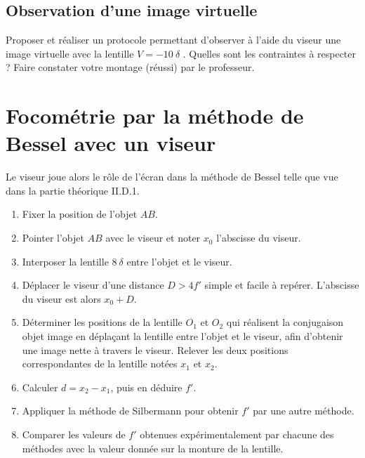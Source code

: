\documentclass[a4paper, 12pt, final, garamond]{book}
\begin{document}
\subsection{Observation d'une image virtuelle}

Proposer et réaliser un protocole permettant d'observer à l'aide du viseur une
image virtuelle avec la lentille $V = \SI{-10}{\delta}$ .
Quelles sont les contraintes à respecter ? 
Faire constater votre montage (réussi) par le professeur. 

\section{Focométrie par la méthode de Bessel avec un viseur}

Le viseur joue alors le rôle de l'écran dans la méthode de Bessel telle que vue dans la partie théorique II.D.1. 

\begin{enumerate}
    \item Fixer la position de l'objet $AB$.
    \item Pointer l'objet $AB$ avec le viseur et noter $x_0$ l'abscisse du
        viseur.
    \item Interposer la lentille $\SI{8}{\delta}$ entre l'objet et le viseur.
    \item Déplacer le viseur d'une distance $D > 4f '$ simple et facile à
        repérer. L'abscisse du viseur est alors $x_0 + D$.
    \item Déterminer les positions de la lentille $O_1$ et $O_2$ qui réalisent
        la conjugaison objet image en déplaçant la lentille entre l'objet et le
        viseur, afin d'obtenir une image nette à travers le viseur. Relever les
        deux positions correspondantes de la lentille notées $x_1$ et $x_2$. 
    \item Calculer $d = x_2-x_1$, puis en déduire $f'$.
    \item Appliquer la méthode de Silbermann pour obtenir $f'$ par une autre
        méthode. 
    \item Comparer les valeurs de $f'$ obtenues expérimentalement par chacune
        des méthodes avec la valeur donnée sur la monture de la lentille. 
\end{enumerate}

% 
\end{document}
